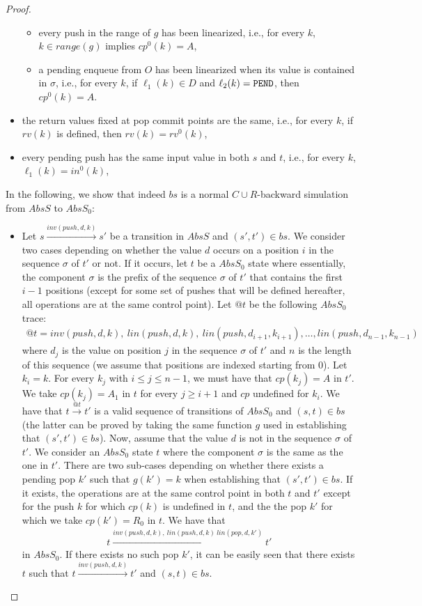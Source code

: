 \begin{proof}
\begin{itemize}
\begin{itemize}
		\item every push in the range of $g$ has been linearized, i.e., for every $k$, $k\in range(g)$ implies $cp^0(k)=A$,
		\item a pending enqueue from $O$ has been linearized when its value is contained in $\sigma$, i.e., for every $k$, if $\ell_1(k)\in D$ and $\ell_2(k)={\tt PEND}$, then $cp^0(k)=A$.
	\end{itemize}
	\item the return values fixed at pop commit points are the same, i.e., for every $k$, if $rv(k)$ is defined, then $rv(k)=rv^0(k)$,
	\item every pending push has the same input value in both $s$ and $t$, i.e., for every $k$, $\ell_1(k)=in^0(k)$,
\end{itemize}

In the following, we show that indeed $bs$ is a normal $C\cup R$-backward simulation from $AbsS$ to $AbsS_0$:
\begin{itemize}
	\item Let $s\xrightarrow{inv(push,d,k)} s'$ be a transition in $AbsS$ and $(s',t')\in bs$. We consider two cases depending on whether the value $d$ occurs on a position $i$ in the sequence $\sigma$ of $t'$ or not. If it occurs, let $t$ be a $AbsS_0$ state where essentially, the component $\sigma$ is the prefix of the sequence $\sigma$ of $t'$ that contains the first $i-1$ positions (except for some set of pushes that will be defined hereafter, all operations are at the same control point). Let $@t$ be the following $AbsS_0$ trace:
	\begin{align*}
	@t=inv(push,d,k),\ lin(push,d,k),\ lin(push,d_{i+1},k_{i+1}),\ldots,lin(push,d_{n-1},k_{n-1})
	\end{align*}
	where $d_j$ is the value on position $j$ in the sequence $\sigma$ of $t'$ and $n$ is the length of this sequence (we assume that positions are indexed starting from $0$). Let $k_i=k$.
	For every $k_j$ with $i\leq j\leq n-1$, we must have that $cp(k_j)=A$ in $t'$. We take $cp(k_j)=A_1$ in $t$ for every $j\geq i+1$ and $cp$ undefined for $k_i$.
	We have that $t\xrightarrow{@t} t'$ is a valid sequence of transitions of $AbsS_0$ and $(s,t)\in bs$ (the latter can be proved by taking the same function $g$ used in establishing that $(s',t')\in bs$).
	Now, assume that the value $d$ is not in the sequence $\sigma$ of $t'$.  We consider an $AbsS_0$ state $t$ where the component $\sigma$ is the same as the one in $t'$. There are two sub-cases depending on whether there exists a pending pop $k'$ such that $g(k')=k$ when establishing that $(s',t')\in bs$. If it exists, the operations are at the same control point in both $t$ and $t'$ except for the push $k$ for which $cp(k)$ is undefined in $t$, and the the pop $k'$ for which we take $cp(k')=R_0$ in $t$. We have that 
	\begin{align*}
	t\xrightarrow{inv(push,d,k),\ lin(push,d,k)\ lin(pop,d,k')} t'
	\end{align*}
	in $AbsS_0$. If there exists no such pop $k'$, it can be easily seen that there exists $t$ such that $t\xrightarrow{inv(push,d,k)} t'$ and $(s,t)\in bs$.	


\end{itemize}
\end{proof}
